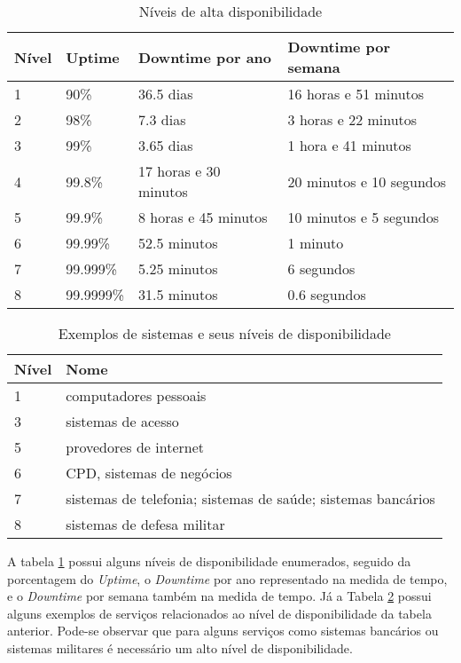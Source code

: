 \begin{table}
\caption {Níveis de alta disponibilidade}
\label{tab:dispniveis} 
\begin{center}
\begin{tabular}{|l|l|l|l|}\hline
Nível & Uptime & Downtime por ano & Downtime por semana\\\hline
1 & 90\% & 36.5 dias & 16 horas e 51 minutos\\\hline
2 & 98\% & 7.3 dias & 3 horas e 22 minutos\\\hline
3 & 99\% & 3.65 dias & 1 hora e 41 minutos\\\hline
4 & 99.8\% & 17 horas e 30 minutos & 20 minutos e 10 segundos\\\hline
5 & 99.9\% & 8 horas e 45 minutos & 10 minutos e 5 segundos\\\hline
6 & 99.99\% & 52.5 minutos & 1 minuto\\\hline
7 & 99.999\% & 5.25 minutos & 6 segundos\\\hline
8 & 99.9999\% & 31.5 minutos & 0.6 segundos\\\hline
\end{tabular}
\end{center}
\end{table}

\begin{table}
\caption {Exemplos de sistemas e seus níveis de disponibilidade}
\label{tab:dispexemplos} 
\begin{center}
\begin{tabular}{|l|l|}\hline
Nível  & Nome\\\hline
1 & computadores pessoais\\\hline
3 & sistemas de acesso\\\hline
5 & provedores de internet\\\hline
6 & CPD, sistemas de negócios\\\hline
7 & sistemas de telefonia; sistemas de saúde; sistemas bancários\\\hline
8 & sistemas de defesa militar\\\hline
\end{tabular}
\end{center}
\end{table}

A tabela \ref{tab:dispniveis} possui alguns níveis de disponibilidade enumerados, seguido da porcentagem do \textit{Uptime}, 
o \textit{Downtime} por ano representado na medida de tempo, e o \textit{Downtime} por semana também na medida de tempo. 
Já a Tabela \ref{tab:dispexemplos} possui alguns exemplos de serviços relacionados ao nível de disponibilidade da tabela anterior. 
Pode-se observar que para alguns serviços como sistemas bancários ou sistemas militares é necessário um alto nível de disponibilidade.

